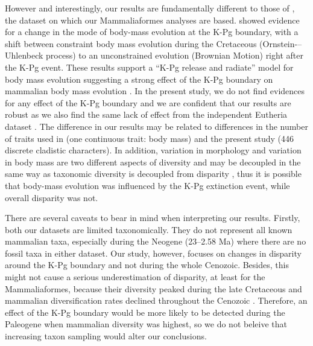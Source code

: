 \documentclass[12pt,letterpaper]{article}
\begin{document}
However and interestingly, our results are fundamentally different to those of \cite{Slater2012MEE}, the dataset on which our Mammaliaformes analyses are based. 
\cite{Slater2012MEE} showed evidence for a change in the mode of body-mass evolution at the K-Pg boundary, with a shift between constraint body mass evolution during the Cretaceous (Ornstein-–Uhlenbeck process) to an unconstrained evolution (Brownian Motion) right after the K-Pg event.
These results support a ``K-Pg release and radiate'' model for body mass evolution suggesting a strong effect of the K-Pg boundary on mammalian body mass evolution \citep{Slater2012MEE}. %
In the present study, we do not find evidences for any effect of the K-Pg boundary and we are confident that our results are robust as we also find the same lack of effect from the independent Eutheria dataset \citep[i.e.][]{beckancient2014}.
The difference in our results may be related to differences in the number of traits used in \cite{Slater2012MEE} (one continuous trait: body mass) and the present study (446 discrete cladistic characters).
In addition, variation in morphology and variation in body mass are two different aspects of diversity and may be decoupled in the same way as taxonomic diversity is decoupled from disparity \citep{slaterCetacean,ruta2013,hopkinsdecoupling2013}, thus it is possible that body-mass evolution was influenced by the K-Pg extinction event, while overall disparity was not.

There are several caveats to bear in mind when interpreting our results. 
Firstly, both our datasets are limited taxonomically.
They do not represent all known mammalian taxa, especially during the Neogene (23--2.58 Ma) where there are no fossil taxa in either dataset.
Our study, however, focuses on changes in disparity around the K-Pg boundary and not during the whole Cenozoic.
Besides, this might not cause a serious underestimation of disparity, at least for the Mammaliaformes, because their diversity peaked during the late Cretaceous \citep[Campanian; 72.1--83.6 Ma;][]{Newham201432} and mammalian diversification rates declined throughout the Cenozoic \citep{Raia2012}.
Therefore, an effect of the K-Pg boundary would be more likely to be detected during the Paleogene when mammalian diversity was highest, so we do not beleive that increasing taxon sampling would alter our conclusions.
\end{document}
